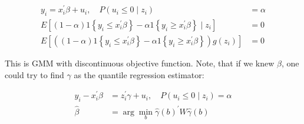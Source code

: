\begin{align*}
    y_i=x_i^{\prime} \beta+u_i, \quad P\left(u_i \leq 0 \mid z_i\right) &= \alpha \\
    E\left[(1-\alpha)  1\left\{y_i \leq x_i^{\prime} \beta\right\}-\alpha  1\left\{y_i \geq x_i^{\prime} \beta\right\} \mid z_i\right] &= 0 \\
    E\left[\left((1-\alpha)  1\left\{y_i \leq x_i^{\prime} \beta\right\}-\alpha  1\left\{y_i \geq x_i^{\prime} \beta\right\}\right) g\left(z_i\right)\right] &= 0
\end{align*}

This is GMM with discontinuous objective function. Note, that if we knew $\beta$, one could try to find $\gamma$ as the quantile regression estimator:

\begin{align*}
    y_i-x_i^{\prime} \beta &= z_i^{\prime} \gamma+u_i, \quad P\left(u_i \leq 0 \mid z_i\right)=\alpha \\
    \widehat{\beta} &= \arg \min _b \widehat{\gamma}(b)^{\prime} W \widehat{\gamma}(b)
\end{align*}